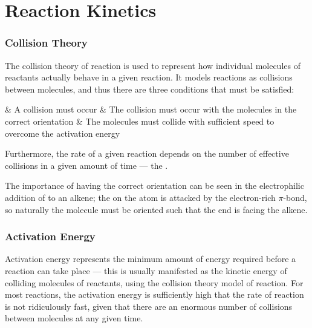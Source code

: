 
\pagebreak
\part{Reaction Kinetics}

	\section{Collision Theory}
		The collision theory of reaction is used to represent how individual molecules of reactants actually behave in a given reaction.
		It models reactions as collisions between molecules, and thus there are three conditions that must be satisfied:

		\begin{bulletlist}
			& A collision must occur
			& The collision must occur with the molecules in the correct orientation
			& The molecules must collide with sufficient speed to overcome the activation energy
		\end{bulletlist}

		Furthermore, the rate of a given reaction depends on the number of effective collisions in a given amount of time --- the
		.

		The importance of having the correct orientation can be seen in the electrophilic addition of  to an alkene; the \deltap{}
		on the  atom is attacked by the electron-rich $\pi$-bond, so naturally the  molecule must be oriented such that the 
		end is facing the alkene.




	\section{Activation Energy}

		Activation energy represents the minimum amount of energy required before a reaction can take place --- this is usually manifested as
		the kinetic energy of colliding molecules of reactants, using the collision theory model of reaction. For most reactions, the activation
		energy is sufficiently high that the rate of reaction is not ridiculously fast, given that there are an enormous number of collisions
		between molecules at any given time.


